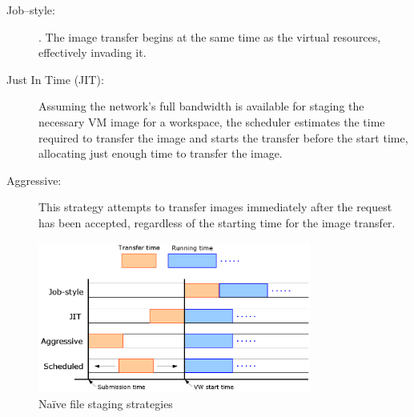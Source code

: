 \begin{description}
\item[Job--style:]. The image transfer begins at the same time as the virtual resources, effectively invading it.
\item[Just In Time (JIT):] Assuming the network's full bandwidth is available for staging the necessary VM image for a workspace, the scheduler estimates the time required to transfer the image and starts the transfer before the start time, allocating just enough time to transfer the image.
\item[Aggressive:] This strategy attempts to transfer images immediately after the request has been accepted, regardless of the
starting time for the image transfer.
\end{description}



\begin{figure}
  \begin{center}
    \includegraphics[width=0.8\textwidth]{figures/filetransfer.png}
    \caption{Naïve file staging strategies}
	\label{fig:filetransfer}
  \end{center}
\end{figure}




